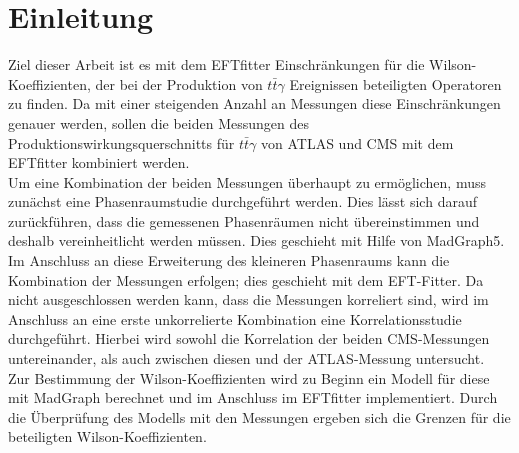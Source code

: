 \chapter{Einleitung}
Ziel dieser Arbeit ist es mit dem EFTfitter\cite{Castro:2016jjv} Einschränkungen für die Wilson-Koeffizienten, der bei der Produktion von $t\bar{t}\gamma$ Ereignissen beteiligten Operatoren zu finden. Da mit einer steigenden Anzahl an Messungen diese Einschränkungen genauer werden, sollen die beiden Messungen des Produktionswirkungsquerschnitts für $t\bar{t}\gamma$ von ATLAS\cite{Aaboud:2017era} und CMS\cite{Sirunyan:2017iyh} mit dem EFTfitter kombiniert werden.\\
Um eine Kombination der beiden Messungen überhaupt zu ermöglichen, muss zunächst eine Phasenraumstudie durchgeführt werden. Dies lässt sich darauf zurückführen, dass die gemessenen Phasenräumen nicht übereinstimmen und deshalb vereinheitlicht werden müssen. Dies geschieht mit Hilfe von MadGraph5.\\
Im Anschluss an diese Erweiterung des kleineren Phasenraums kann die Kombination der Messungen erfolgen; dies geschieht mit dem EFT-Fitter. Da nicht ausgeschlossen werden kann, dass die Messungen korreliert sind, wird im Anschluss an eine erste unkorrelierte Kombination eine Korrelationsstudie durchgeführt. Hierbei wird sowohl die Korrelation der beiden CMS-Messungen untereinander, als auch zwischen diesen und der ATLAS-Messung untersucht.\\
Zur Bestimmung der Wilson-Koeffizienten wird zu Beginn ein Modell für diese mit MadGraph berechnet und im Anschluss im EFTfitter implementiert. Durch die Überprüfung des Modells mit den Messungen ergeben sich die Grenzen für die beteiligten Wilson-Koeffizienten.
